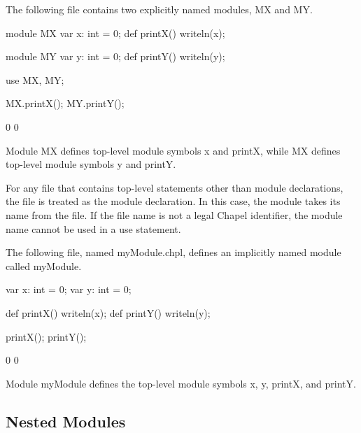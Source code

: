 \begin{example}
The following file contains two explicitly named modules, MX and MY.
\begin{chapelpre}
\end{chapelpre}
\begin{chapel}
module MX {
  var x: int = 0;
  def printX() {
    writeln(x);
  }
}

module MY {
  var y: int = 0;
  def printY() {
    writeln(y);
  }
}
\end{chapel}
\begin{chapelpost}
use MX, MY;

MX.printX();
MY.printY();
\end{chapelpost}
\begin{chapeloutput}
0
0
\end{chapeloutput}
Module MX defines top-level module symbols x and printX, while MX
defines top-level module symbols y and printY.
\end{example}

For any file that contains top-level statements other than module
declarations, the file is treated as the module declaration.  In this
case, the module takes its name from the file.  If the file name is
not a legal Chapel identifier, the module name cannot be used in a use
statement.

\begin{example}
The following file, named myModule.chpl, defines an implicitly named
module called myModule.
\begin{chapelpre}
\end{chapelpre}
\begin{chapel}
var x: int = 0;
var y: int = 0;

def printX() {
  writeln(x);
}
def printY() {
  writeln(y);
}
\end{chapel}
\begin{chapelpost}
printX();
printY();
\end{chapelpost}
\begin{chapeloutput}
0
0
\end{chapeloutput}
Module myModule defines the top-level module symbols x, y, printX, and
printY.
\end{example}


\subsection{Nested Modules}
\label{Nested_Modules}

